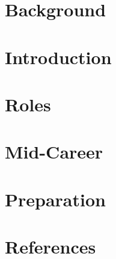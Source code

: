 \section[Back]{Background}


\section[Intro]{Introduction}


\section[Roles]{Roles}
% 



% 

\section[Mid]{Mid-Career}


\section[Prep]{Preparation}



\section[Refs]{References}
